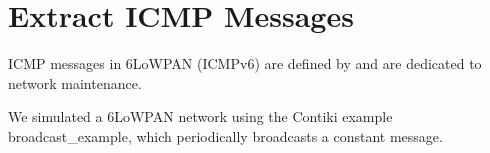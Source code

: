 \section{Extract ICMP Messages}
ICMP messages in 6LoWPAN (ICMPv6) are defined by \cite{rfc4443} and are dedicated to network maintenance. 

We simulated a 6LoWPAN network using the Contiki example broadcast\_example, which periodically broadcasts a constant message.